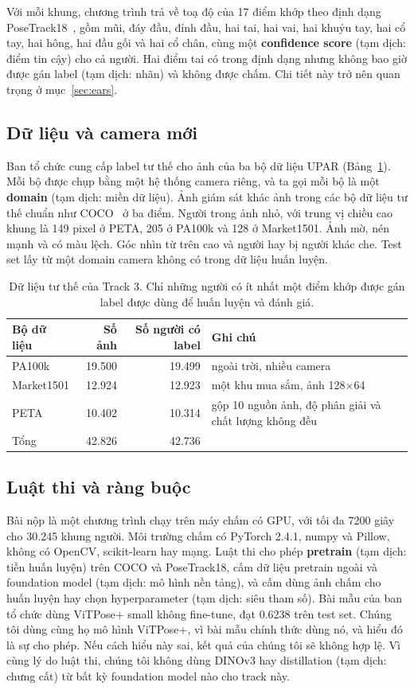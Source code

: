 \documentclass[11pt,a4paper]{article}
\begin{document}
Với mỗi khung, chương trình trả về toạ độ của 17 điểm khớp theo định dạng PoseTrack18~\cite{posetrack}, gồm mũi, đáy đầu, đỉnh đầu, hai tai, hai vai, hai khuỷu tay, hai cổ tay, hai hông, hai đầu gối và hai cổ chân, cùng một \textbf{confidence score} (tạm dịch: điểm tin cậy) cho cả người. Hai điểm tai có trong định dạng nhưng không bao giờ được gán label (tạm dịch: nhãn) và không được chấm. Chi tiết này trở nên quan trọng ở mục~\ref{sec:ears}.

\subsection{Dữ liệu và camera mới}

Ban tổ chức cung cấp label tư thế cho ảnh của ba bộ dữ liệu UPAR (Bảng~\ref{tab:data}). Mỗi bộ được chụp bằng một hệ thống camera riêng, và ta gọi mỗi bộ là một \textbf{domain} (tạm dịch: miền dữ liệu). Ảnh giám sát khác ảnh trong các bộ dữ liệu tư thế chuẩn như COCO~\cite{coco} ở ba điểm. Người trong ảnh nhỏ, với trung vị chiều cao khung là 149 pixel ở PETA, 205 ở PA100k và 128 ở Market1501. Ảnh mờ, nén mạnh và có màu lệch. Góc nhìn từ trên cao và người hay bị người khác che. Test set lấy từ một domain camera không có trong dữ liệu huấn luyện.

\begin{table}[H]
\centering\small
\begin{tabular}{@{}lrrl@{}}
\toprule
Bộ dữ liệu & Số ảnh & Số người có label & Ghi chú \\
\midrule
PA100k & 19.500 & 19.499 & ngoài trời, nhiều camera \\
Market1501 & 12.924 & 12.923 & một khu mua sắm, ảnh 128×64 \\
PETA & 10.402 & 10.314 & gộp 10 nguồn ảnh, độ phân giải và chất lượng không đều \\
\midrule
Tổng & 42.826 & 42.736 & \\
\bottomrule
\end{tabular}
\caption{Dữ liệu tư thế của Track 3. Chỉ những người có ít nhất một điểm khớp được gán label được dùng để huấn luyện và đánh giá.}
\label{tab:data}
\end{table}

\subsection{Luật thi và ràng buộc}

Bài nộp là một chương trình chạy trên máy chấm có GPU, với tối đa 7200 giây cho 30.245 khung người. Môi trường chấm có PyTorch 2.4.1, numpy và Pillow, không có OpenCV, scikit-learn hay mạng. Luật thi cho phép \textbf{pretrain} (tạm dịch: tiền huấn luyện) trên COCO và PoseTrack18, cấm dữ liệu pretrain ngoài và foundation model (tạm dịch: mô hình nền tảng), và cấm dùng ảnh chấm cho huấn luyện hay chọn hyperparameter (tạm dịch: siêu tham số). Bài mẫu của ban tổ chức dùng ViTPose+ small không fine-tune, đạt 0.6238 trên test set. Chúng tôi dùng cùng họ mô hình ViTPose+, vì bài mẫu chính thức dùng nó, và hiểu đó là sự cho phép. Nếu cách hiểu này sai, kết quả của chúng tôi sẽ không hợp lệ. Vì cùng lý do luật thi, chúng tôi không dùng DINOv3 hay distillation (tạm dịch: chưng cất) từ bất kỳ foundation model nào cho track này.
\end{document}
